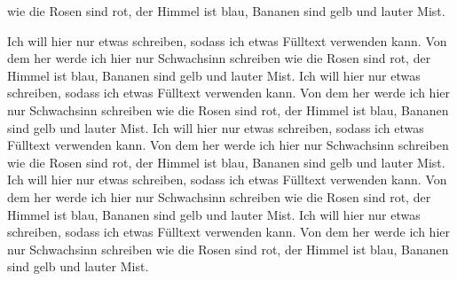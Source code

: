wie die Rosen sind rot, der Himmel ist blau, Bananen sind gelb und lauter Mist. 

Ich will hier nur etwas schreiben, sodass ich etwas Fülltext verwenden kann. Von dem her werde ich hier nur Schwachsinn schreiben wie die Rosen sind rot, der Himmel ist blau, Bananen sind gelb und lauter Mist. Ich will hier nur etwas schreiben, sodass ich etwas Fülltext verwenden kann. Von dem her werde ich hier nur Schwachsinn schreiben wie die Rosen sind rot, der Himmel ist blau, Bananen sind gelb und lauter Mist. Ich will hier nur etwas schreiben, sodass ich etwas Fülltext verwenden kann. Von dem her werde ich hier nur Schwachsinn schreiben wie die Rosen sind rot, der Himmel ist blau, Bananen sind gelb und lauter Mist. Ich will hier nur etwas schreiben, sodass ich etwas Fülltext verwenden kann. Von dem her werde ich hier nur Schwachsinn schreiben wie die Rosen sind rot, der Himmel ist blau, Bananen sind gelb und lauter Mist. Ich will hier nur etwas schreiben, sodass ich etwas Fülltext verwenden kann. Von dem her werde ich hier nur Schwachsinn schreiben wie die Rosen sind rot, der Himmel ist blau, Bananen sind gelb und lauter Mist. 

